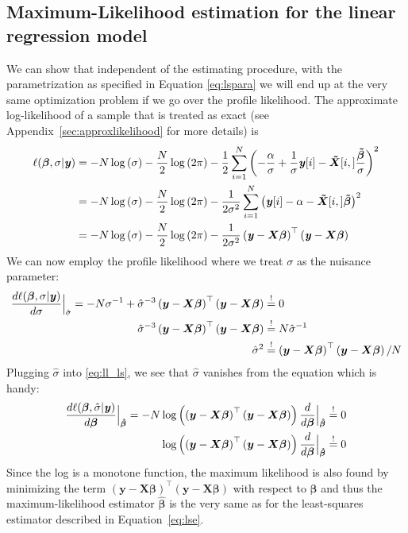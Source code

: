 \documentclass[11pt,a4paper,twoside]{book}\usepackage[]{graphicx}\usepackage[]{xcolor}
\begin{document}
\subsection{Maximum-Likelihood estimation for the linear regression model}\label{sec:mlnlm}

We can show that independent of the estimating procedure, with the parametrization as specified in Equation \eqref{eq:lspara} we will end up at the very same optimization problem if we go over the profile likelihood.
The approximate log-likelihood of a sample that is treated as exact (see Appendix~\ref{sec:approxlikelihood} for more details) is
\begin{align}
\ell(\boldsymbol{\beta},\sigma|{\textbf{\textit{y}}})&=-N\log\left(\sigma\right)-\frac{N}{2}\log\left(2\pi\right)-\frac{1}{2}\sum_{i=1}^N\left(-\frac{\alpha}{\sigma}+\frac{1}{\sigma} {\textbf{\textit{y}}}[i]-\boldsymbol{\tilde{X}}[i,]\frac{\boldsymbol{\tilde\beta}}{\sigma}\right)^2 \nonumber\\
&=-N\log\left(\sigma\right)-\frac{N}{2}\log\left(2\pi\right)-\frac{1}{2\sigma^2}\sum_{i=1}^N\left({\textbf{\textit{y}}}[i]-\alpha-\boldsymbol{\tilde{X}}[i,]\boldsymbol{\tilde\beta}\right)^2 \nonumber\\
&=-N\log\left(\sigma\right)-\frac{N}{2}\log\left(2\pi\right)-\frac{1}{2\sigma^2}\left({\textbf{\textit{y}}}-{\boldsymbol{X}}{\boldsymbol{\beta}}\right)^\top\left({\textbf{\textit{y}}}-{\boldsymbol{X}}{\boldsymbol{\beta}}\right) \label{eq:ll_ls}
\end{align}
We can now employ the profile likelihood where we treat $\sigma$ as the nuisance parameter:
\begin{align*}
\frac{d\ell(\boldsymbol{\beta},\sigma|\y)}{d\sigma}\Big|_{\hat\sigma}=-N\sigma^{-1}+\hat\sigma^{-3}\left(\boldsymbol{y}-\boldsymbol{X\beta}\right)^\top\left(\boldsymbol{y}-\boldsymbol{X\beta}\right)&\stackrel{!}{=}0 \\
\hat\sigma^{-3}\left(\boldsymbol{y}-\boldsymbol{X\beta}\right)^\top\left(\boldsymbol{y}-\boldsymbol{X\beta}\right)&\stackrel{!}{=}N\hat\sigma^{-1}\\
\hat\sigma^2&\stackrel{!}{=}\left(\boldsymbol{y}-\boldsymbol{X\beta}\right)^\top\left(\boldsymbol{y}-\boldsymbol{X\beta}\right)/N
\end{align*}
Plugging $\hat\sigma$ into \eqref{eq:ll_ls}, we see that $\hat\sigma$ vanishes from the equation which is handy:
\begin{align*}
\frac{d\ell(\boldsymbol{\beta},\hat\sigma|\y)}{d\boldsymbol{\beta}}\Big|_{\hbbeta}=-N\log\left(\left(\boldsymbol{y}-\boldsymbol{X\beta}\right)^\top\left(\boldsymbol{y}-\boldsymbol{X\beta}\right)\right)\frac{d}{d\boldsymbol{\beta}}\Big|_{\hbbeta}&\stackrel{!}{=}0\\
\log\left(\left(\boldsymbol{y}-\boldsymbol{X\beta}\right)^\top\left(\boldsymbol{y}-\boldsymbol{X\beta}\right)\right)\frac{d}{d\boldsymbol{\beta}}\Big|_{\hbbeta}&\stackrel{!}{=}0
\end{align*}
Since the log is a monotone function, the maximum likelihood is also found by minimizing the term $\left(\boldsymbol{y}-\boldsymbol{X\beta}\right)^\top\left(\boldsymbol{y}-\boldsymbol{X\beta}\right)$ with respect to $\boldsymbol{\beta}$ and thus the maximum-likelihood estimator $\boldsymbol{\hat\beta}$ is the very same as for the least-squares estimator described in Equation~\eqref{eq:lse}.
\end{document}
